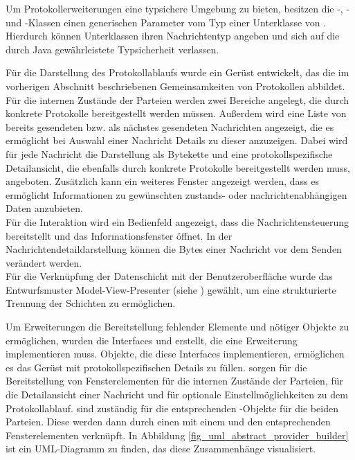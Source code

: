 Um Protokollerweiterungen eine typsichere Umgebung zu bieten, besitzen die -, - und -Klassen einen generischen Parameter vom Typ einer Unterklasse von . Hierdurch können Unterklassen ihren Nachrichtentyp angeben und sich auf die durch Java gewährleistete Typsicherheit verlassen.


Für die Darstellung des Protokollablaufs wurde ein Gerüst entwickelt, das die im vorherigen Abschnitt beschriebenen Gemeinsamkeiten von Protokollen abbildet. Für die internen Zustände der Parteien werden zwei Bereiche angelegt, die durch konkrete Protokolle bereitgestellt werden müssen. Außerdem wird eine Liste von bereits gesendeten bzw. als nächstes gesendeten Nachrichten angezeigt, die es ermöglicht bei Auswahl einer Nachricht Details zu dieser anzuzeigen. Dabei wird für jede Nachricht die Darstellung als Bytekette und eine protokollspezifische Detailansicht, die ebenfalls durch konkrete Protokolle bereitgestellt werden muss, angeboten. Zusätzlich kann ein weiteres Fenster angezeigt werden, dass es ermöglicht Informationen zu gewünschten zustands- oder nachrichtenabhängigen Daten anzubieten.\\
Für die Interaktion wird ein Bedienfeld angezeigt, dass die Nachrichtensteuerung bereitstellt und das Informationsfenster öffnet. In der Nachrichtendetaildarstellung können die Bytes einer Nachricht vor dem Senden verändert werden.\\
Für die Verknüpfung der Datenschicht mit der Benutzeroberfläche wurde das Entwurfsmuster Model-View-Presenter (siehe \cite{potel96}) gewählt, um eine strukturierte Trennung der Schichten zu ermöglichen.


Um Erweiterungen die Bereitstellung fehlender Elemente und nötiger Objekte zu ermöglichen, wurden die Interfaces  und  erstellt, die eine Erweiterung implementieren muss. Objekte, die diese Interfaces implementieren, ermöglichen es das Gerüst mit protokollspezifischen Details zu füllen.  sorgen für die Bereitstellung von Fensterelementen für die internen Zustände der Parteien, für die Detailansicht einer Nachricht und für optionale Einstellmöglichkeiten zu dem Protokollablauf.  sind zuständig für die entsprechenden -Objekte für die beiden Parteien. Diese werden dann durch einen  mit einem  und den entsprechenden Fensterelementen verknüpft. In Abbildung \ref{fig_uml_abstract_provider_builder} ist ein UML-Diagramm zu finden, das diese Zusammenhänge visualisiert. 

